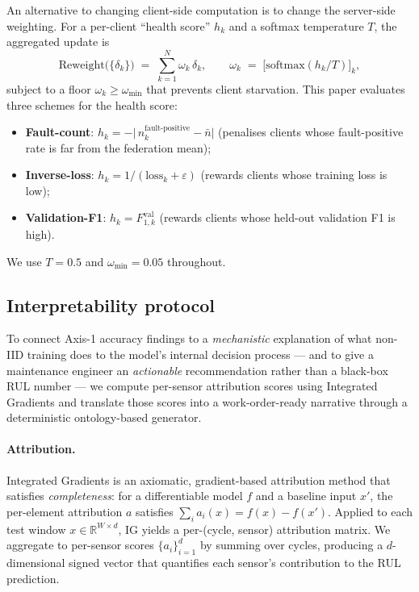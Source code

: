 \documentclass[a4paper,fleqn,doubleblind]{cas-sc}
\begin{document}
An alternative to changing client-side computation is to change the
server-side weighting. For a per-client ``health score'' $h_k$ and
a softmax temperature $T$, the aggregated update is
\begin{equation}
    \mathrm{Reweight}\bigl(\{\delta_k\}\bigr)
    \;=\; \sum_{k=1}^{N} \omega_k\, \delta_k,
    \qquad
    \omega_k \;=\; \bigl[\mathrm{softmax}(h_k / T)\bigr]_k,
    \label{eq:reweight}
\end{equation}
subject to a floor $\omega_k \geq \omega_{\min}$ that prevents
client starvation. This paper evaluates three schemes for the
health score:
\begin{itemize}
    \item \textbf{Fault-count}: $h_k = -\bigl|\, n_k^{\text{fault-positive}} - \bar{n}\bigr|$ (penalises clients whose fault-positive rate is far from the federation mean);
    \item \textbf{Inverse-loss}: $h_k = 1 / (\text{loss}_k + \varepsilon)$ (rewards clients whose training loss is low);
    \item \textbf{Validation-F1}: $h_k = F_{1,k}^{\mathrm{val}}$ (rewards clients whose held-out validation F1 is high).
\end{itemize}
We use $T = 0.5$ and $\omega_{\min} = 0.05$ throughout.

\subsection{Interpretability protocol}
\label{subsec:interpretability}

To connect Axis-1 accuracy findings to a \emph{mechanistic}
explanation of what non-IID training does to the model's internal
decision process --- and to give a maintenance engineer an
\emph{actionable} recommendation rather than a black-box RUL number
--- we compute per-sensor attribution scores using Integrated
Gradients \citep{Sundararajan2017IntegratedGradients} and translate
those scores into a work-order-ready narrative through a
deterministic ontology-based generator.

\paragraph{Attribution.}
Integrated Gradients is an axiomatic, gradient-based attribution
method that satisfies \emph{completeness}: for a differentiable
model $f$ and a baseline input $x'$, the per-element attribution
$a$ satisfies $\sum_i a_i(x) = f(x) - f(x')$. Applied to each test
window $x \in \mathbb{R}^{W \times d}$, IG yields a per-(cycle,
sensor) attribution matrix. We aggregate to per-sensor scores
$\{a_i\}_{i=1}^d$ by summing over cycles, producing a
$d$-dimensional signed vector that quantifies each sensor's
contribution to the RUL prediction.
\end{document}
